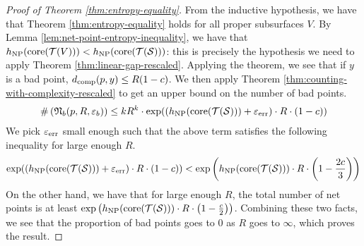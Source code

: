 \begin{proof}[Proof of Theorem \ref{thm:entropy-equality}]
  From the inductive hypothesis, we have that Theorem \ref{thm:entropy-equality} holds for all proper subsurfaces $V$.
  By Lemma \ref{lem:net-point-entropy-inequality}, we have that $h_{\mathrm{NP}}(\mathrm{core}(\mathcal{T}(V))) < h_{\mathrm{NP}}(\mathrm{core}(\mathcal{T}(\mathcal{S})))$: this is precisely the hypothesis we need to apply Theorem \ref{thm:linear-gap-rescaled}.
  Applying the theorem, we see that if $y$ is a bad point, $d_{\mathrm{comp}}(p, y) \leq R(1 - c)$.
  We then apply Theorem \ref{thm:counting-with-complexity-rescaled} to get an upper bound on the number of bad points.
  \begin{align*}
    \#\left( \mathfrak{N}_b(p, R, \varepsilon_b) \right) \leq kR^k \cdot \exp((h_{\mathrm{NP}}(\mathrm{core}(\mathcal{T}(\mathcal{S}))) + \varepsilon_{\mathrm{err}}) \cdot R \cdot (1 - c))
  \end{align*}
  We pick $\varepsilon_{\mathrm{err}}$ small enough such that the above term satisfies the following inequality for large enough $R$.
  \begin{align*}
    \exp((h_{\mathrm{NP}}(\mathrm{core}(\mathcal{T}(\mathcal{S}))) + \varepsilon_{\mathrm{err}}) \cdot R \cdot (1 - c)) < \exp\left(h_{\mathrm{NP}}(\mathrm{core}(\mathcal{T}(\mathcal{S}))) \cdot R \cdot \left(1 - \frac{2c}{3}\right)\right)
  \end{align*}
  On the other hand, we have that for large enough $R$, the total number of net points is at least $\exp\left(h_{\mathrm{NP}}(\mathrm{core}(\mathcal{T}(\mathcal{S}))) \cdot R \cdot \left(1 - \frac{c}{2}\right)\right)$.
  Combining these two facts, we see that the proportion of bad points goes to $0$ as $R$ goes to $\infty$, which proves the result.
\end{proof}



